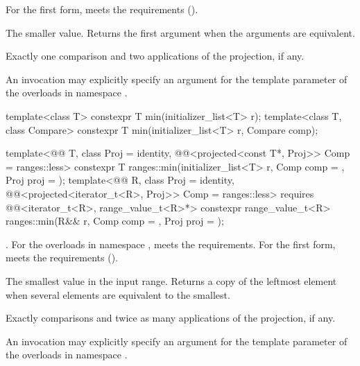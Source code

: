 \begin{itemdescr}
\pnum
\expects
For the first form,  meets the
 requirements ().

\pnum
\returns
The smaller value.
Returns the first argument when the arguments are equivalent.

\pnum
\complexity
Exactly one comparison and two applications of the projection, if any.

\pnum
\remarks
An invocation may explicitly specify
an argument for the template parameter 
of the overloads in namespace .
\end{itemdescr}

%
\begin{itemdecl}
template<class T>
  constexpr T min(initializer_list<T> r);
template<class T, class Compare>
  constexpr T min(initializer_list<T> r, Compare comp);

template<@@ T, class Proj = identity,
         @@<projected<const T*, Proj>> Comp = ranges::less>
  constexpr T ranges::min(initializer_list<T> r, Comp comp = {}, Proj proj = {});
template<@@ R, class Proj = identity,
         @@<projected<iterator_t<R>, Proj>> Comp = ranges::less>
  requires @@<iterator_t<R>, range_value_t<R>*>
  constexpr range_value_t<R>
    ranges::min(R&& r, Comp comp = {}, Proj proj = {});
\end{itemdecl}

\begin{itemdescr}
\pnum
\expects
{}.
For the overloads in namespace ,
 meets the  requirements.
For the first form,  meets the 
requirements ().

\pnum
\returns
The smallest value in the input range.
Returns a copy of the leftmost element
when several elements are equivalent to the smallest.

\pnum
\complexity
Exactly  comparisons
and twice as many applications of the projection, if any.

\pnum
\remarks
An invocation may explicitly specify
an argument for the template parameter 
of the overloads in namespace .
\end{itemdescr}


